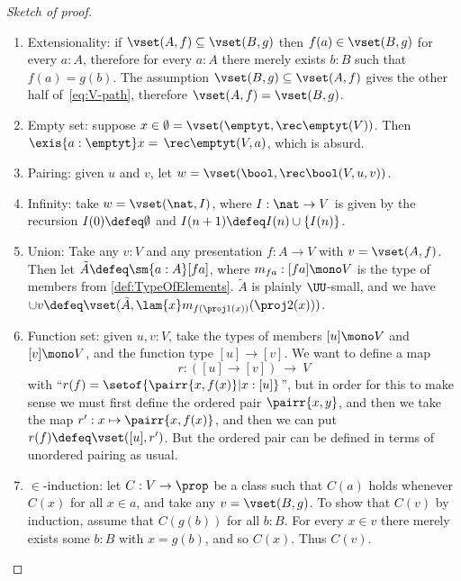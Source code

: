 \begin{proof}[Sketch of proof]
  \mbox{}
  \begin{enumerate}
  \item Extensionality: if $\vset(A,f) \subseteq \vset(B, g)$ then $f(a) \in \vset(B, g)$
    for every $a : A$, therefore for every $a : A$ there merely exists $b : B$ such that
    $f(a) = g(b)$. The assumption $\vset(B, g) \subseteq \vset(A, f)$ gives the other half
    of~\eqref{eq:V-path}, therefore $\vset(A,f) = \vset(B,g)$.

  \item Empty set: suppose $x\in \emptyset = \vset(\emptyt,\rec\emptyt(V))$.  Then $\exis{a:\emptyt}x=\, \rec\emptyt(V,a)$, which is absurd.

  \item Pairing: given $u$ and $v$, let $w=\vset(\bool,\rec\bool(V,u,v))$.

  \item Infinity: take $w = \vset(\nat,I)$, where $I: \nat \to V$ is given by the recursion $I(0) \defeq \emptyset$ and $I(n+1) \defeq I(n)\cup \{I(n)\}$.

  \item Union: Take any $v:V$ and any presentation $f :A\to V$ with $v=\vset(A,f)$.  Then let $\tilde{A} \defeq \sm{a:A}[fa]$, where $m_{fa} : [fa] \mono V$ is the type of members from \cref{def:TypeOfElements}.  $\tilde{A}$ is plainly $\UU$-small, and we have $\cup v \defeq \vset(\tilde{A}, \lam{x} m_{f(\proj1(x))}(\proj2(x)))$.

  \item Function set: given $u, v:V$, take the types of members $[u] \mono V$ and $[v] \mono V$, and the function type $[u]\to [v]$.  We want to define a map
  \[
 r: ([u]\to [v])\ \longrightarrow\ V
  \]
   with ``$r(f) = \setof{ \pairr{x, f(x)} | x : [u] }$'', but in order for this to make sense we must first define the ordered pair $\pairr{x, y}$, and then we take the map $r': x \mapsto \pairr{x, f(x)}$, and then we can put $r(f)\defeq \vset([u], r')$.  But the ordered pair can be defined in terms of unordered pairing as usual.

  \item $\in$-induction: let $C : V \to \prop$ be a class such that $C(a)$ holds whenever $C(x)$ for all $x\in a$, and take any $v=\vset(B,g)$.  To show that $C(v)$ by induction, assume that $C(g(b))$ for all $b:B$.  For every $x\in v$ there merely exists some $b:B$ with $x = g(b)$, and so $C(x)$.  Thus $C(v)$.


\end{enumerate}
\end{proof}
